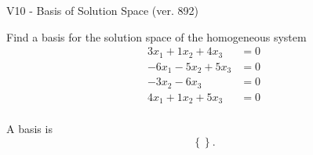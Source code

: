 \begin{exercise}
  \begin{exerciseTitle}V10 - Basis of Solution Space (ver. 892)\end{exerciseTitle}
  \begin{exerciseStatement}
    Find a basis for the solution space of the homogeneous system 
\begin{align*}
 3 x_ 1 + 1 x_ 2 + 4 x_ 3 &= 0  \\ 
  -6 x_ 1 -5 x_ 2 + 5 x_ 3 &= 0  \\ 
  -3 x_ 2 -6 x_ 3 &= 0  \\ 
  4 x_ 1 + 1 x_ 2 + 5 x_ 3 &= 0  \\ 
 \end{align*}


 
  \end{exerciseStatement}

  \begin{exerciseAnswer}
   A basis is   
\[\left\{\right\}.\]

  


  \end{exerciseAnswer}
\end{exercise}